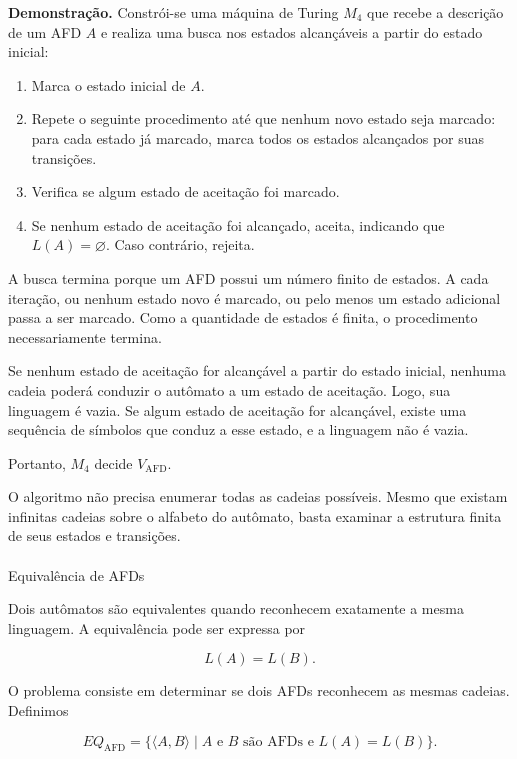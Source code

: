 \documentclass[
  brazilian,
  letterpaper,
]{book}
\makeatletter
\let\oldparagraph\paragraph
\renewcommand{\paragraph}{
    \@ifstar
      \xxxParagraphStar
      \xxxParagraphNoStar
  }
\newcommand{\xxxParagraphStar}[1]{\oldparagraph*{#1}\mbox{}}
\newcommand{\xxxParagraphNoStar}[1]{\oldparagraph{#1}\mbox{}}
\providecommand{\tightlist}{%
  \setlength{\itemsep}{0pt}\setlength{\parskip}{0pt}}
\theoremstyle{plain}
\theoremstyle{definition}
\theoremstyle{remark}
\makeatother
\begin{document}
\textbf{Demonstração.} Constrói-se uma máquina de Turing \(M_4\) que
recebe a descrição de um AFD \(A\) e realiza uma busca nos estados
alcançáveis a partir do estado inicial:

\begin{enumerate}
\def\labelenumi{\arabic{enumi}.}
\tightlist
\item
  Marca o estado inicial de \(A\).
\item
  Repete o seguinte procedimento até que nenhum novo estado seja
  marcado: para cada estado já marcado, marca todos os estados
  alcançados por suas transições.
\item
  Verifica se algum estado de aceitação foi marcado.
\item
  Se nenhum estado de aceitação foi alcançado, aceita, indicando que
  \(L(A)=\varnothing\). Caso contrário, rejeita.
\end{enumerate}

A busca termina porque um AFD possui um número finito de estados. A cada
iteração, ou nenhum estado novo é marcado, ou pelo menos um estado
adicional passa a ser marcado. Como a quantidade de estados é finita, o
procedimento necessariamente termina.

Se nenhum estado de aceitação for alcançável a partir do estado inicial,
nenhuma cadeia poderá conduzir o autômato a um estado de aceitação.
Logo, sua linguagem é vazia. Se algum estado de aceitação for
alcançável, existe uma sequência de símbolos que conduz a esse estado, e
a linguagem não é vazia.

Portanto, \(M_4\) decide \(V_{\mathrm{AFD}}\).

O algoritmo não precisa enumerar todas as cadeias possíveis. Mesmo que
existam infinitas cadeias sobre o alfabeto do autômato, basta examinar a
estrutura finita de seus estados e transições.

\paragraph{Equivalência de AFDs}\label{equivaluxeancia-de-afds}

Dois autômatos são equivalentes quando reconhecem exatamente a mesma
linguagem. A equivalência pode ser expressa por

\[
L(A)=L(B).
\]

O problema consiste em determinar se dois AFDs reconhecem as mesmas
cadeias. Definimos

\[
EQ_{\mathrm{AFD}}=\{\langle A,B\rangle\mid A\text{ e }B\text{ são AFDs e }L(A)=L(B)\}.
\]
\end{document}
